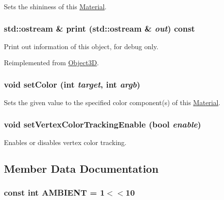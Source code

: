 Sets the shininess of this \hyperlink{classm3g_1_1Material}{Material}. \hypertarget{classm3g_1_1Material_6fea17fa1532df3794f8cb39cb4f911f}{
\subsubsection[{print}]{\setlength{\rightskip}{0pt plus 5cm}std::ostream \& print (std::ostream \& {\em out}) const}}
\label{classm3g_1_1Material_6fea17fa1532df3794f8cb39cb4f911f}


Print out information of this object, for debug only. 

Reimplemented from \hyperlink{classm3g_1_1Object3D_6fea17fa1532df3794f8cb39cb4f911f}{Object3D}.\hypertarget{classm3g_1_1Material_5947a525a18bca77aa890971df2ae48a}{
\subsubsection[{setColor}]{\setlength{\rightskip}{0pt plus 5cm}void setColor (int {\em target}, \/  int {\em argb})}}
\label{classm3g_1_1Material_5947a525a18bca77aa890971df2ae48a}


Sets the given value to the specified color component(s) of this \hyperlink{classm3g_1_1Material}{Material}. \hypertarget{classm3g_1_1Material_55778ceeb6408e5db698c793dea1edd6}{
\subsubsection[{setVertexColorTrackingEnable}]{\setlength{\rightskip}{0pt plus 5cm}void setVertexColorTrackingEnable (bool {\em enable})}}
\label{classm3g_1_1Material_55778ceeb6408e5db698c793dea1edd6}


Enables or disables vertex color tracking. 

\subsection{Member Data Documentation}
\hypertarget{classm3g_1_1Material_4cf648a82d9de62a1fb15f4277049594}{
\subsubsection[{AMBIENT}]{\setlength{\rightskip}{0pt plus 5cm}const int {\bf AMBIENT} = 1$<$$<$10}}
\label{classm3g_1_1Material_4cf648a82d9de62a1fb15f4277049594}



